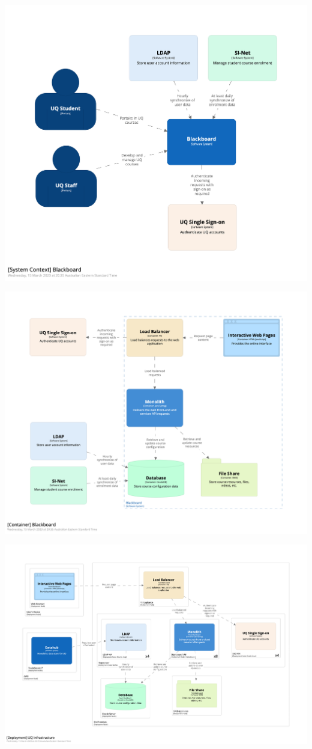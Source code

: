 \documentclass{csse4400}
\begin{document}
\includegraphics[width=\textwidth]{images/context}

\includegraphics[width=\textwidth]{images/container}

\includegraphics[width=\textwidth]{images/deployment}
\end{document}

